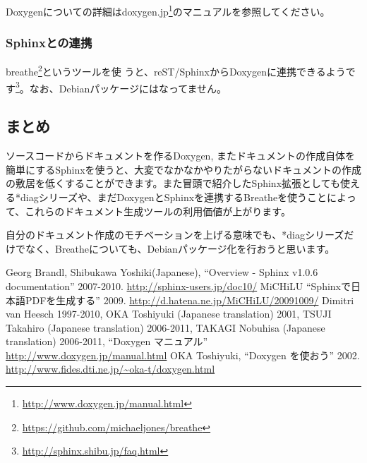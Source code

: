 \documentclass[mingoth,a4paper]{jsarticle}
\begin{document}
Doxygenについての詳細はdoxygen.jp\footnote{\url{http://www.doxygen.jp/manual.html}}のマニュアルを参照してください。

\subsubsection{Sphinxとの連携}

breathe\footnote{\url{https://github.com/michaeljones/breathe}}というツールを使
うと、reST/SphinxからDoxygenに連携できるようです\footnote{\url{http://sphinx.shibu.jp/faq.html}}。なお、Debianパッケージにはなってません。

\subsection{まとめ}
ソースコードからドキュメントを作るDoxygen, またドキュメントの作成自体を簡単にするSphinxを使うと、大変でなかなかやりたがらないドキュメントの作成の敷居を低くすることができます。また冒頭で紹介したSphinx拡張としても使える*diagシリーズや、まだDoxygenとSphinxを連携するBreatheを使うことによって、これらのドキュメント生成ツールの利用価値が上がります。

自分のドキュメント作成のモチベーションを上げる意味でも、*diagシリーズだけでなく、Breatheについても、Debianパッケージ化を行おうと思います。

{\footnotesize
\begin{thebibliography}{0}
  Georg Brandl, Shibukawa Yoshiki(Japanese),
	 ``Overview - Sphinx v1.0.6 documentation'' 2007-2010. \url{http://sphinx-users.jp/doc10/}
    MiCHiLU ``Sphinxで日本語PDFを生成する'' 2009. \url{http://d.hatena.ne.jp/MiCHiLU/20091009/}
    Dimitri van Heesch 1997-2010, OKA Toshiyuki (Japanese translation) 2001, TSUJI Takahiro (Japanese translation) 2006-2011,  TAKAGI Nobuhisa (Japanese translation) 2006-2011, ``Doxygen マニュアル'' \url{http://www.doxygen.jp/manual.html}
  OKA Toshiyuki, ``Doxygen を使おう'' 2002. \url{http://www.fides.dti.ne.jp/~oka-t/doxygen.html}
\end{thebibliography}
}


\end{document}

